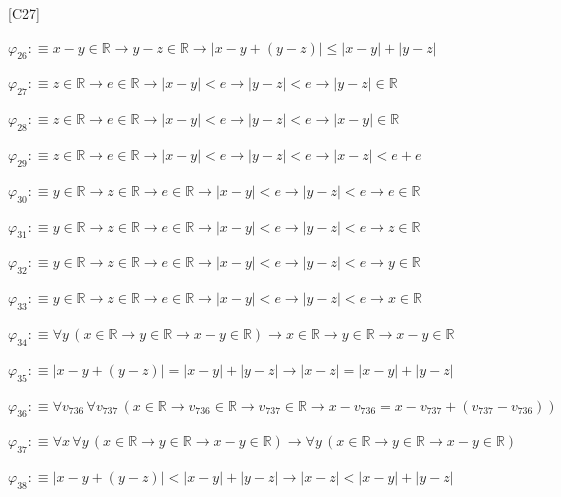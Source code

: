 \begin{fullproof}{[C27]}
\begin{abbrevlist}
\item $\varphi_{26} :\equiv x - y \in \mathbb{R} \to y - z \in \mathbb{R} \to \lvert x - y + (y - z) \rvert \leq \lvert x - y \rvert + \lvert y - z \rvert$
\item $\varphi_{27} :\equiv z \in \mathbb{R} \to e \in \mathbb{R} \to \lvert x - y \rvert < e \to \lvert y - z \rvert < e \to \lvert y - z \rvert \in \mathbb{R}$
\item $\varphi_{28} :\equiv z \in \mathbb{R} \to e \in \mathbb{R} \to \lvert x - y \rvert < e \to \lvert y - z \rvert < e \to \lvert x - y \rvert \in \mathbb{R}$
\item $\varphi_{29} :\equiv z \in \mathbb{R} \to e \in \mathbb{R} \to \lvert x - y \rvert < e \to \lvert y - z \rvert < e \to \lvert x - z \rvert < e + e$
\item $\varphi_{30} :\equiv y \in \mathbb{R} \to z \in \mathbb{R} \to e \in \mathbb{R} \to \lvert x - y \rvert < e \to \lvert y - z \rvert < e \to e \in \mathbb{R}$
\item $\varphi_{31} :\equiv y \in \mathbb{R} \to z \in \mathbb{R} \to e \in \mathbb{R} \to \lvert x - y \rvert < e \to \lvert y - z \rvert < e \to z \in \mathbb{R}$
\item $\varphi_{32} :\equiv y \in \mathbb{R} \to z \in \mathbb{R} \to e \in \mathbb{R} \to \lvert x - y \rvert < e \to \lvert y - z \rvert < e \to y \in \mathbb{R}$
\item $\varphi_{33} :\equiv y \in \mathbb{R} \to z \in \mathbb{R} \to e \in \mathbb{R} \to \lvert x - y \rvert < e \to \lvert y - z \rvert < e \to x \in \mathbb{R}$
\item $\varphi_{34} :\equiv \forall y\,(x \in \mathbb{R} \to y \in \mathbb{R} \to x - y \in \mathbb{R}) \to x \in \mathbb{R} \to y \in \mathbb{R} \to x - y \in \mathbb{R}$
\item $\varphi_{35} :\equiv \lvert x - y + (y - z) \rvert = \lvert x - y \rvert + \lvert y - z \rvert \to \lvert x - z \rvert = \lvert x - y \rvert + \lvert y - z \rvert$
\item $\varphi_{36} :\equiv \forall v_{736}\,\forall v_{737}\,(x \in \mathbb{R} \to v_{736} \in \mathbb{R} \to v_{737} \in \mathbb{R} \to x - v_{736} = x - v_{737} + (v_{737} - v_{736}))$
\item $\varphi_{37} :\equiv \forall x\,\forall y\,(x \in \mathbb{R} \to y \in \mathbb{R} \to x - y \in \mathbb{R}) \to \forall y\,(x \in \mathbb{R} \to y \in \mathbb{R} \to x - y \in \mathbb{R})$
\item $\varphi_{38} :\equiv \lvert x - y + (y - z) \rvert < \lvert x - y \rvert + \lvert y - z \rvert \to \lvert x - z \rvert < \lvert x - y \rvert + \lvert y - z \rvert$

\end{abbrevlist}
\end{fullproof}
